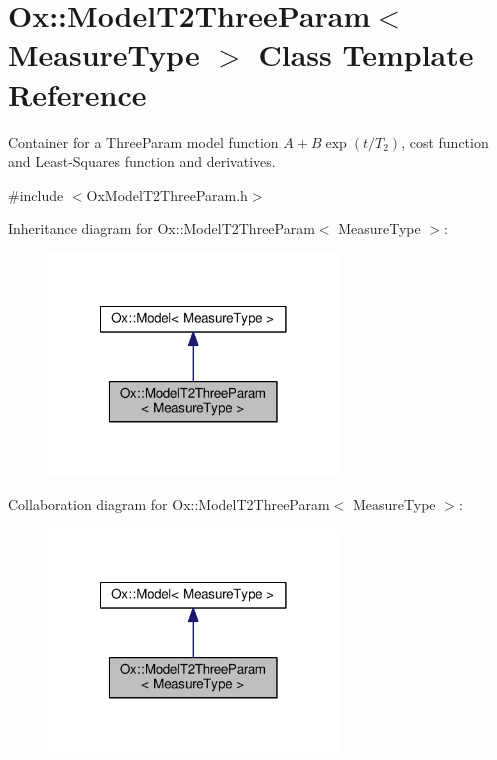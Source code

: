 \hypertarget{class_ox_1_1_model_t2_three_param}{\section{Ox\-:\-:Model\-T2\-Three\-Param$<$ Measure\-Type $>$ Class Template Reference}
\label{class_ox_1_1_model_t2_three_param}
}


Container for a Three\-Param model function $ A + B\exp(t/T_2) $, cost function and Least-\/\-Squares function and derivatives.  




{\ttfamily \#include $<$Ox\-Model\-T2\-Three\-Param.\-h$>$}



Inheritance diagram for Ox\-:\-:Model\-T2\-Three\-Param$<$ Measure\-Type $>$\-:
\nopagebreak
\begin{figure}[H]
\begin{center}
\leavevmode
\includegraphics[width=218pt]{class_ox_1_1_model_t2_three_param__inherit__graph}
\end{center}
\end{figure}


Collaboration diagram for Ox\-:\-:Model\-T2\-Three\-Param$<$ Measure\-Type $>$\-:
\nopagebreak
\begin{figure}[H]
\begin{center}
\leavevmode
\includegraphics[width=218pt]{class_ox_1_1_model_t2_three_param__coll__graph}
\end{center}
\end{figure}
